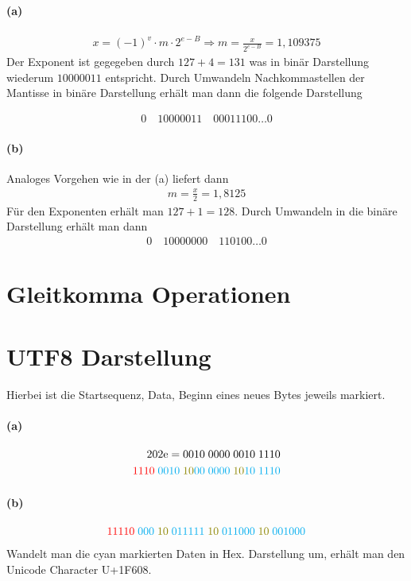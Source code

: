 \documentclass[a4paper]{article}
\begin{document}
\paragraph{(a)}
\begin{align*}
    x=(-1)^v\cdot m \cdot2^{e-B} \Rightarrow m=\frac{x}{2^{e-B}}=1,109375
\end{align*}
Der Exponent ist gegegeben durch $127+4=131$ was in binär Darstellung wiederum $10000011$ entspricht. Durch Umwandeln Nachkommastellen der Mantisse in binäre Darstellung erhält man dann die folgende Darstellung

\begin{align*}
    0 \quad 10000011 \quad 00011100\dots 0
\end{align*}

\paragraph{(b)}
Analoges Vorgehen wie in der (a) liefert dann
\begin{align*}
    m=\frac{x}{2}=1,8125
\end{align*}
Für den Exponenten erhält man $127+1=128$. Durch Umwandeln in die binäre Darstellung erhält man dann
\begin{align*}
    0 \quad 10000000 \quad 110100\dots 0
\end{align*}


\section{Gleitkomma Operationen}


\section{UTF8 Darstellung}
Hierbei ist die \color{red} Startsequenz, \color{cyan} Data, \color{olive} Beginn eines neues Bytes \color{black} jeweils markiert. 
\paragraph{(a)}
\begin{align*}
    \text{202e}=0010\;0000\;0010\;1110\\
    \color{red}1110\;\color{cyan}0010\;\color{olive}10\color{cyan}00\;0000\;\color{olive}10\color{cyan}10\;1110\\
\end{align*}


\paragraph{(b)}
\begin{align*}
    \color{red}11110\; \color{cyan} 000\; \color{olive}10\; \color{cyan}011111\; \color{olive}10\;\color{cyan}011000\; \color{olive}10 \;\color{cyan} 001000\\
\end{align*}
Wandelt man die \color{cyan}cyan \color{black} markierten Daten in Hex. Darstellung um, erhält man den Unicode Character U+1F608.
\end{document}
